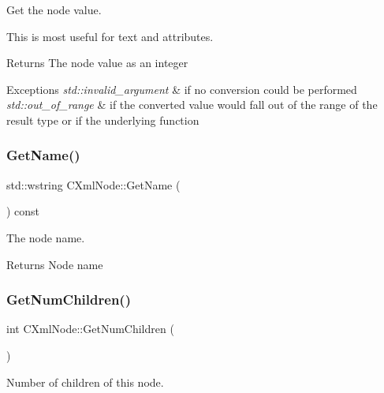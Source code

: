 Get the node value. 

This is most useful for text and attributes. \begin{DoxyReturn}{Returns}
The node value as an integer 
\end{DoxyReturn}

\begin{DoxyExceptions}{Exceptions}
{\em std\+::invalid\+\_\+argument} & if no conversion could be performed \\
\hline
{\em std\+::out\+\_\+of\+\_\+range} & if the converted value would fall out of the range of the result type or if the underlying function \\
\hline
\end{DoxyExceptions}
\mbox{\label{classxmlnode_1_1_c_xml_node_a84d2553bd71bde08ee2a65fb1eedf3a4}} 
\subsubsection{\texorpdfstring{GetName()}{GetName()}}
{\footnotesize\ttfamily std\+::wstring C\+Xml\+Node\+::\+Get\+Name (\begin{DoxyParamCaption}{ }\end{DoxyParamCaption}) const}



The node name. 

\begin{DoxyReturn}{Returns}
Node name 
\end{DoxyReturn}
\mbox{\label{classxmlnode_1_1_c_xml_node_ab455bd55e7f3dbd550e81d7fe293d146}} 
\subsubsection{\texorpdfstring{GetNumChildren()}{GetNumChildren()}}
{\footnotesize\ttfamily int C\+Xml\+Node\+::\+Get\+Num\+Children (\begin{DoxyParamCaption}{ }\end{DoxyParamCaption})}



Number of children of this node. 

